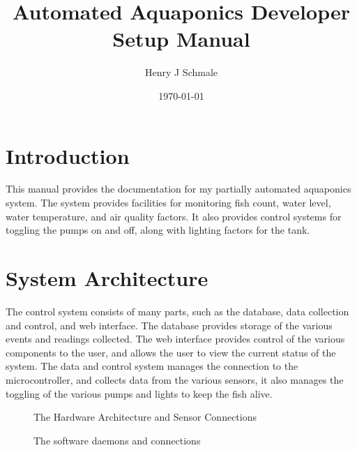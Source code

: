 \documentclass[american,12pt]{article}
\title{Automated Aquaponics Developer Setup Manual}
\author{Henry J Schmale}
\date{\today}
\begin{document}
\maketitle
\tableofcontents

\section{Introduction}
This manual provides the documentation for my partially automated aquaponics
system. The system provides facilities for monitoring fish count, water level,
water temperature, and air quality factors. It also provides control systems
for toggling the pumps on and off, along with lighting factors for the tank.

\section{System Architecture}
The control system consists of many parts, such as the database, data collection
and control, and web interface. The database provides storage of the various
events and readings collected. The web interface provides control of the various
components to the user, and allows the user to view the current status of the system.
The data and control system manages the connection to the microcontroller, and collects
data from the various sensors, it also manages the toggling of the various pumps and
lights to keep the fish alive.

\begin{figure}[h]
    \centering
    \caption{The Hardware Architecture and Sensor Connections}
    \label{fig:Hardware Architecture}
\end{figure}

\begin{figure}[h]
    \centering
    \caption{The software daemons and connections}
    \label{fig:Software Architecture}
\end{figure}
\end{document}
